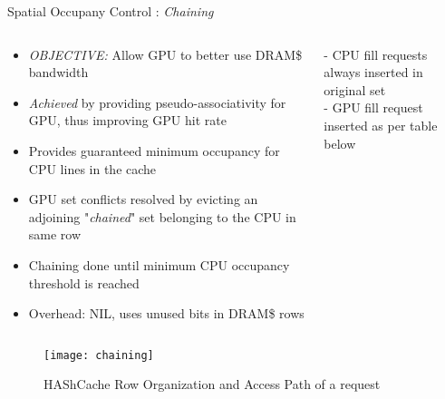 \documentclass[final,t]{beamer}
\newcommand*\circled[1]{\tikz[baseline=(char.base)]{
            \node[shape=circle,draw,inner sep=2pt] (char) {#1};}}
\begin{document}
\begin{frame}[t,fragile]{}
\begin{columns}[t]
\begin{column}{.47\linewidth}
    \begin{exampleblock}{\circled{2} Spatial Occupany Control : \textit{Chaining}}
    \begin{columns} [T]
    \begin{column}{0.6\linewidth}    
    	\begin{itemize}
	    	\item \emph{OBJECTIVE:} Allow GPU to better use DRAM\$ bandwidth
		    \item \emph{Achieved} by providing pseudo-associativity for GPU, thus improving GPU hit rate
		    \item Provides guaranteed minimum occupancy for CPU lines in the cache
	    	\item GPU set conflicts resolved by evicting an adjoining "\textit{chained}" set belonging to the CPU in same row
		    \item Chaining done until minimum CPU occupancy threshold is reached
		    \item Overhead: NIL, uses unused bits in DRAM\$ rows
	    \end{itemize}
	\end{column}
	\begin{column}{0.4\linewidth}
		\scriptsize
		- CPU fill requests always inserted in original set\\
		- GPU fill request inserted as per table below\\
		\begin{table}[]
		\centering
			
		\end{table}
	\end{column}
	\end{columns}
	\vspace{\baselineskip}
    \centering
    \begin{figure}
    	\texttt{[image: chaining]}
    	\caption{HAShCache Row Organization and Access Path of a request}
    \end{figure}
    \end{exampleblock}
    

\end{column}
\end{columns}
\end{frame}
\end{document}
